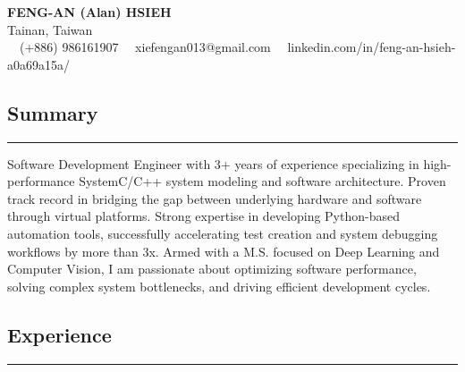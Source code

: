 \documentclass[11pt,letterpaper]{article}
\begin{document}
\begin{center}
	{\LARGE \textbf{FENG-AN (Alan) HSIEH}}\\
	Tainan, Taiwan
	\vspace{0.05cm}
	\\
	\raisebox{-0.2\height} {\Large \faPhoneSquare} \ \  (+886) 986161907 
    \raisebox{-0.2\height}{\Large \faEnvelopeSquare} \ \ xiefengan013@gmail.com %
    \raisebox{-0.2\height}{\Large \faLinkedinSquare} \ \ linkedin.com/in/feng-an-hsieh-a0a69a15a/
\end{center}

\subsection*{\Large Summary}
\hrule
\vspace{1em}

\begin{itemize}[leftmargin=1em,noitemsep]
	
    Software Development Engineer with 3+ years of experience specializing in high-performance SystemC/C++ system modeling and software architecture. Proven track record in bridging the gap between underlying hardware and software through virtual platforms. Strong expertise in developing Python-based automation tools, successfully accelerating test creation and system debugging workflows by more than 3x. Armed with a M.S. focused on Deep Learning and Computer Vision, I am passionate about optimizing software performance, solving complex system bottlenecks, and driving efficient development cycles.
          
\end{itemize}
\subsection*{\Large Experience}
\hrule
\vspace{1em}
\end{document}
